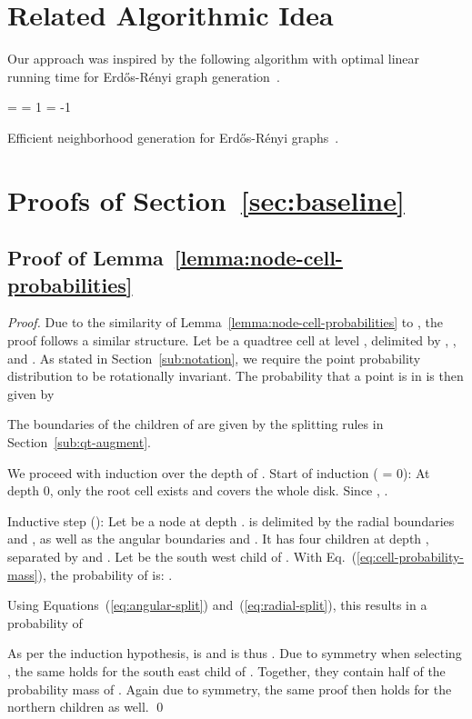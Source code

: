 \documentclass{llncs}
\begin{document}



\clearpage
\appendix

\section{Related Algorithmic Idea}
\label{sec:fast-batagelji-brandes}
Our approach was inspired by the following algorithm with optimal linear running time
for Erd\H{o}s-R\'{e}nyi graph generation~\cite{batagelj2005efficient}.

\begin{algorithm}[H]
\KwOut{} 
  = \;
  = 1\;
  = -1\;
 \caption{Efficient neighborhood generation for Erd\H{o}s-R\'{e}nyi graphs~\cite{batagelj2005efficient}.}
 \label{algo:fast-batagelji-brandes}
\end{algorithm}

\section{Proofs of Section~\ref{sec:baseline}}
\label{sec:basic-qt-proofs}

\subsection{Proof of Lemma~\ref{lemma:node-cell-probabilities}}
\label{sub:proof-lemma-node-cell-probabilities}
\begin{proof}
Due to the similarity of Lemma~\ref{lemma:node-cell-probabilities} to \cite[Lemma 1]{Looz2015HRG}, the proof follows a similar structure.
Let  be a quadtree cell at level , delimited by , ,  and .
As stated in Section~\ref{sub:notation}, we require the point probability distribution to be rotationally invariant.
The probability that a point  is in  is then given by 

The boundaries of the children of  are given by the splitting rules in Section~\ref{sub:qt-augment}.

We proceed with induction over the depth  of .
Start of induction ( = 0):
At depth 0, only the root cell exists and covers the whole disk.
Since , .

Inductive step ():
Let  be a node at depth .
 is delimited by the radial boundaries  and , as well as the angular boundaries  and .
It has four children at depth , separated by  and . Let  be the south west child of .
With Eq.~(\ref{eq:cell-probability-mass}), the probability of  is:
.

Using Equations~(\ref{eq:angular-split}) and~(\ref{eq:radial-split}), this results in a probability of 

As per the induction hypothesis,  is  and  is thus .
Due to symmetry when selecting , the same holds for the south east child of . Together, they contain half of the probability mass of .
Again due to symmetry, the same proof then holds for the northern children as well.
\qed
\end{proof}
\end{document}
